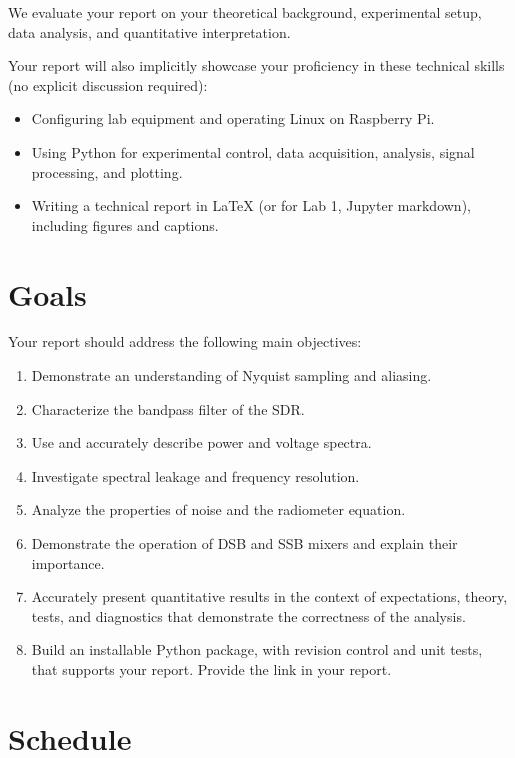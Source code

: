 \documentclass[11pt,preprint]{aastex}
\begin{document}
\noindent
We evaluate your report on your theoretical background, experimental setup,
data analysis, and quantitative interpretation.

Your report will also implicitly showcase your proficiency in these technical skills (no explicit
discussion required):

\begin{itemize}
    \item Configuring lab equipment and operating Linux on Raspberry Pi.
    \item Using Python for experimental control, data acquisition, analysis,
    signal processing, and plotting.
    \item Writing a technical report in \LaTeX
    (or for Lab 1, Jupyter markdown),
    including figures and captions.
\end{itemize}


\section{Goals}
\label{goals}

\noindent
Your report should address the following main objectives:
\begin{enumerate}
    \item Demonstrate an understanding of Nyquist sampling and aliasing.
    \item Characterize the bandpass filter of the SDR.
    \item Use and accurately describe power and voltage spectra.
    \item Investigate spectral leakage and frequency resolution.
    \item Analyze the properties of noise and the radiometer equation.
    \item Demonstrate the operation of DSB and SSB mixers and explain their importance.
    \item Accurately present quantitative results in the context of expectations,
    theory, tests, and diagnostics that demonstrate the correctness of the analysis.
    \item Build an installable Python package, with revision control and unit tests,
    that supports your report. Provide the link in your report.
\end{enumerate}

\section{Schedule}
\end{document}
